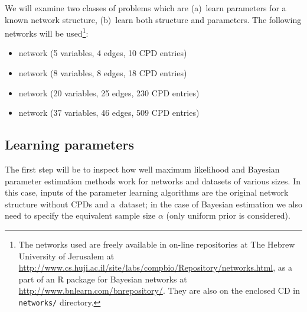 \documentclass[english,cover]{fitthesis} %
\newcommand{\srccode}[1]{{\tt #1}}         %
\begin{document}
We will examine two classes of problems which are (a)~learn parameters for a known network structure, (b)~learn both structure and parameters. The following networks will be used\footnote{The networks used are freely available in on-line repositories at The Hebrew University of Jerusalem at \url{http://www.cs.huji.ac.il/site/labs/compbio/Repository/networks.html}, as a part of an R package for Bayesian networks at \url{http://www.bnlearn.com/bnrepository/}. They are also on the enclosed CD in \srccode{networks/} directory.}:
\begin{itemize}
	\item {} network (5 variables, 4 edges, 10 CPD entries)
	\item {} network (8 variables, 8 edges, 18 CPD entries)
	\item {} network (20 variables, 25 edges, 230 CPD entries)
	\item {} network (37 variables, 46 edges, 509 CPD entries)
\end{itemize}


\subsection{Learning parameters}
The first step will be to inspect how well maximum likelihood and Bayesian parameter estimation methods work for networks and datasets of various sizes. In this case, inputs of the parameter learning algorithms are the original network structure without CPDs and a~dataset; in the case of Bayesian estimation we also need to specify the equivalent sample size $\alpha$ (only uniform prior is considered).
\end{document}
